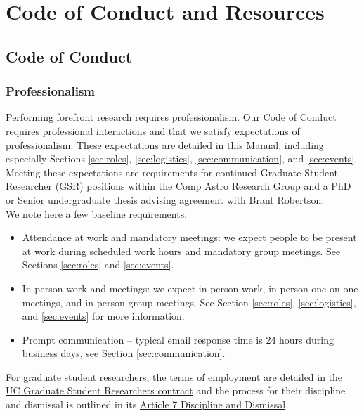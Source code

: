 \section{Code of Conduct and Resources}
\label{sec:code_of_conduct}

\subsection{Code of Conduct}

\subsubsection{Professionalism}

Performing forefront research requires professionalism. Our Code of Conduct requires professional interactions and that we satisfy expectations of professionalism. These expectations are detailed in this Manual, including especially Sections \ref{sec:roles}, \ref{sec:logistics}, \ref{sec:communication}, and \ref{sec:events}. Meeting these expectations
are requirements for continued Graduate Student Researcher (GSR) positions within the Comp Astro Research Group
and a PhD or Senior undergraduate thesis advising agreement with Brant Robertson.\\

\noindent
We note here a few baseline requirements:

\begin{itemize}
	\item Attendance at work and mandatory meetings: we expect people to be present at work during scheduled work hours and mandatory group meetings. See Sections \ref{sec:roles} and \ref{sec:events}.
	\item In-person work and meetings: we expect in-person work, in-person one-on-one meetings, and in-person group meetings. See Section \ref{sec:roles}, \ref{sec:logistics}, and \ref{sec:events} for more information.
	\item Prompt communication -- typical email response time is 24 hours during business days, see Section \ref{sec:communication}.
\end{itemize}

\noindent
For graduate student researchers, the terms of employment are detailed in the \href{https://ucnet.universityofcalifornia.edu/resources/employment-policies-contracts/bargaining-units/graduate-student-researchers/contract/}{UC Graduate Student Researchers contract} and the
process for their discipline and dismissal is outlined in its \href{https://qa.ucnet.universityofcalifornia.edu/labor/bargaining-units/br/docs/br_07_discipline-and-dismissal_20225-2025.pdf}{Article 7 Discipline and Dismissal}.\\


